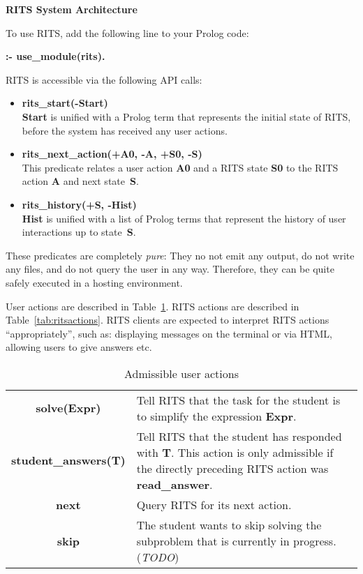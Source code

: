 \documentclass[a4paper,11pt]{article}
\begin{document}
\noindent
\begin{center}
\Large\textbf{RITS System Architecture}
\end{center}

\vspace{1cm}
\noindent
To use RITS, add the following line to your Prolog code:

\bigskip
\textbf{:- use\_module(rits).}
\bigskip

\noindent RITS is accessible via the following API calls:

\begin{itemize}
\item \textbf{rits\_start(-Start)}\\\textbf{Start} is unified with a
  Prolog term that represents the initial state of RITS, before the
  system has received any user actions.

\item \textbf{rits\_next\_action(+A0, -A, +S0, -S)}\\
  This predicate relates a user action \textbf{A0} and a RITS state
  \textbf{S0} to the RITS action \textbf{A} and next state~\textbf{S}.

\item \textbf{rits\_history(+S, -Hist)}\\
  \textbf{Hist} is unified with a list of Prolog terms that represent
  the history of user interactions up to state~\textbf{S}.
\end{itemize}

These predicates are completely \textit{pure}: They no not emit any
output, do not write any files, and do not query the user in any way.
Therefore, they can be quite safely executed in a hosting environment.

User actions are described in Table~\ref{tab:useractions}. RITS
actions are described in Table~\ref{tab:ritsactions}. RITS clients are
expected to interpret RITS actions ``appropriately'', such as:
displaying messages on the terminal or via HTML, allowing users to
give answers etc.

\begin{table}[ht]
  \centering
  \begin{tabular}{cp{7cm}}
    \hline
    \textbf{solve(Expr)} & Tell RITS that the task for the student is to simplify  the expression \textbf{Expr}.\\
    \textbf{student\_answers(T)} & Tell RITS that the student has responded with \textbf{T}. This action is only admissible if the directly preceding RITS action was \textbf{read\_answer}.\\
    \textbf{next} & Query RITS for its next action. \\
    \textbf{skip} & The student wants to skip solving the subproblem that is
    currently in progress. (\textit{TODO})\\
    \hline
  \end{tabular}
\caption{Admissible user actions}
  \label{tab:useractions}
\end{table}
\end{document}

